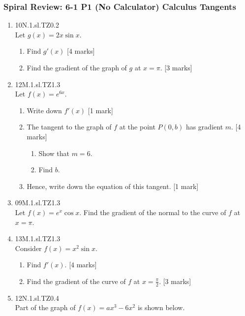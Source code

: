 \documentclass[12pt, twoside]{article}
\begin{document}
\subsubsection*{Spiral Review: 6-1 P1 (No Calculator) Calculus Tangents}
 \begin{enumerate}

  \item 10N.1.sl.TZ0.2\\
  Let $g(x)=2x \sin x$.
  \begin{enumerate}
    \item Find $g'(x)$ [4 marks]
    \item Find the gradient of the graph of $g$ at $x=\pi$. [3 marks]
  \end{enumerate}

  \item 12M.1.sl.TZ1.3\\
  Let $f(x)=e^{6x}$.
  \begin{enumerate}
    \item Write down $f'(x)$ [1 mark]
    \item The tangent to the graph of $f$ at the point $P(0,b)$ has gradient $m$.  [4 marks]
    \begin{enumerate}
      \item Show that $m=6$.
      \item Find $b$.
    \end{enumerate}
    \item Hence, write down the equation of this tangent. [1 mark]
  \end{enumerate}

  \item 09M.1.sl.TZ1.3\\
  Let $f(x)=e^{x} \cos x$. Find the gradient of the normal to the curve of $f$ at $x= \pi$.

  \item 13M.1.sl.TZ1.3\\
  Consider $f(x)=x^2 \sin x$.
  \begin{enumerate}
    \item Find $f'(x)$. [4 marks]
    \item Find the gradient of the curve of $f$ at $x= \frac{\pi}{2}$. [3 marks]
  \end{enumerate}

  \item 12N.1.sl.TZ0.4\\
  Part of the graph of $f(x)= ax^3-6x^2$ is shown below.
    \begin{center}
    \end{center}


\end{enumerate}
\end{document}
